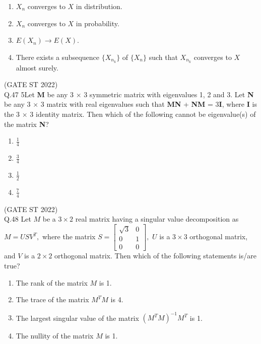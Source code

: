 \documentclass[journal,12pt,onecolumn]{IEEEtran}
\theoremstyle{remark}
\begin{document}
\begin{enumerate}[label=\Alph*.] 
	\item \(X_n\) converges to \(X\) in distribution.
	\item \(X_n\) converges to \(X\) in probability.
	\item \(E(X_n) \longrightarrow E(X)\).
	\item There exists a subsequence \(\{X_{n_k}\}\) of \(\{X_n\}\) such that \(X_{n_k}\) converges to \(X\) almost surely.
\end{enumerate}
\hfill (GATE ST 2022)\\
\vspace{2em}
Q.47 5Let \textbf{M} be any 3 × 3 symmetric matrix with eigenvalues 1, 2 and 3. Let \textbf{N} be any 3 × 3 matrix with real eigenvalues such that \textbf{MN} + \textbf{NM} = 3\textbf{I}, where \textbf{I} is the 3 × 3 identity matrix. Then which of the following cannot be eigenvalue(s) of the matrix \textbf{N}?
\begin{multicols}{4}
\begin{enumerate}[label=\Alph*.] 
	\item $\frac{1}{4}$ 
	\item $\frac{3}{4}$
	\item $\frac{1}{2}$
	\item $\frac{7}{4}$

\end{enumerate}
\end{multicols}
\hfill (GATE ST 2022)\\
	\vspace{2em}
Q.48 Let \(M\) be a \(3 \times 2\) real matrix having a singular value decomposition as $M = USV^T,$ where the matrix $
S = \begin{bmatrix}
	\sqrt{3} & 0 \\
	0 & 1 \\
	0 & 0
\end{bmatrix},
$
\(U\) is a \(3 \times 3\) orthogonal matrix, and \(V\) is a \(2 \times 2\) orthogonal matrix. Then which of the following statements is/are true?
\begin{enumerate}[label=\Alph*.] 
	\item The rank of the matrix \(M\) is 1.
	\item The trace of the matrix \(M^TM\) is 4.
	\item The largest singular value of the matrix \((M^TM)^{-1}M^T\) is 1.
	\item The nullity of the matrix \(M\) is 1.
\end{enumerate}
\end{document}
